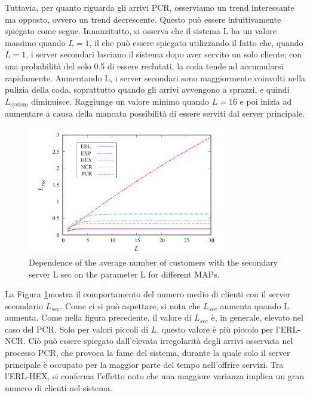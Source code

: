\documentclass[11pt]{article}
\begin{document}
\noindent Tuttavia, per quanto riguarda gli arrivi PCR, osserviamo un trend interessante ma opposto, ovvero un trend decrescente. Questo può essere intuitivamente spiegato come segue. Innanzitutto, si osserva che il sistema L ha un valore massimo quando $L = 1$, il che può essere spiegato utilizzando il fatto che, quando $L = 1$, i server secondari lasciano il sistema dopo aver servito un solo cliente; con una probabilità del solo 0.5 di essere reclutati, la coda tende ad accumularsi rapidamente. Aumentando L, i server secondari sono maggiormente coinvolti nella pulizia della coda, soprattutto quando gli arrivi avvengono a sprazzi, e quindi $L_\text{system}$ diminuisce. Raggiunge un valore minimo quando $L = 16$ e poi inizia ad aumentare a causa della mancata possibilità di essere serviti dal server principale. \vspace{0.4cm}

\begin{figure}[h]
    \centering
    \includegraphics[width=0.8\textwidth]{Tcjl81t.png}
    \caption{ Dependence of the average number of customers with the secondary server L sec on the
    parameter L for different MAPs.}
    \label{fig:2}
\end{figure}

\noindent La Figura \ref{fig:2}mostra il comportamento del numero medio di clienti con il server secondario $L_{sec}$. Come ci si può aspettare, si nota che $L_{sec}$ aumenta quando L aumenta. Come nella figura precedente, il valore di $L_{sec}$ è, in generale, elevato nel caso del PCR. Solo per valori piccoli di $L$, questo valore è più piccolo per l'ERL-NCR. Ciò può essere spiegato dall'elevata irregolarità degli arrivi osservata nel processo PCR, che provoca la fame del sistema, durante la quale solo il server principale è occupato per la maggior parte del tempo nell'offrire servizi. Tra l'ERL-HEX, si conferma l'effetto noto che una maggiore varianza implica un gran numero di clienti nel sistema.
\end{document}
